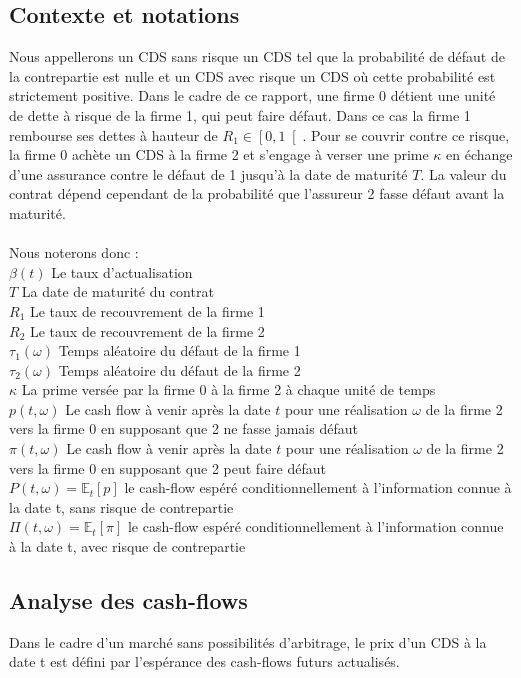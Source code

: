 \documentclass[a4paper]{article}
\theoremstyle{definition}
\theoremstyle{remark}
\begin{document}
\subsection{Contexte et notations}         %
Nous appellerons un CDS sans risque un CDS tel que la probabilité de défaut de la contrepartie est nulle et un CDS avec risque un CDS où cette probabilité est strictement positive.
 Dans le cadre de ce rapport, une firme 0 détient une unité de dette à risque de la firme 1, qui peut faire défaut.
 Dans ce cas la firme 1 rembourse ses dettes à hauteur de $R_{1} \in \left[ 0, 1 \right[$.
 Pour se couvrir contre ce risque, la firme 0 achète un CDS à la firme 2 et s'engage à verser une prime $\kappa$ en échange d'une assurance contre le défaut de 1 jusqu'à la date de maturité $T$.
 La valeur du contrat dépend cependant de la probabilité que l'assureur 2 fasse défaut avant la maturité.
\\ \\
Nous noterons donc :\\
$\beta (t)$ Le taux d'actualisation\\
$T$ La date de maturité du contrat\\
$R_{1}$ Le taux de recouvrement de la firme 1\\
$R_{2}$ Le taux de recouvrement de la firme 2\\
$\tau_{1} (\omega)$ Temps aléatoire du défaut de la firme 1\\
$\tau_{2} (\omega)$ Temps aléatoire du défaut de la firme 2\\
$\kappa$ La prime versée par la firme 0 à la firme 2 à chaque unité de temps\\
$p (t, \omega)$ Le cash flow à venir après la date $t$ pour une réalisation $\omega$ de la firme 2 vers la firme 0 en supposant que 2 ne fasse jamais défaut\\
$\pi (t, \omega)$ Le cash flow à venir après la date $t$ pour une réalisation $\omega$ de la firme 2 vers la firme 0 en supposant que 2 peut faire défaut\\
$P (t, \omega) = \mathbb{E}_{t} [p]$ le cash-flow espéré conditionnellement à l'information connue à la date t, sans risque de contrepartie\\
$\Pi (t, \omega) = \mathbb{E}_{t} [\pi]$ le cash-flow espéré conditionnellement à l'information connue à la date t, avec risque de contrepartie


\subsection{Analyse des cash-flows}
Dans le cadre d'un marché sans possibilités d'arbitrage, le prix d'un CDS à la date t est défini par l'espérance des cash-flows futurs actualisés.
\end{document}
